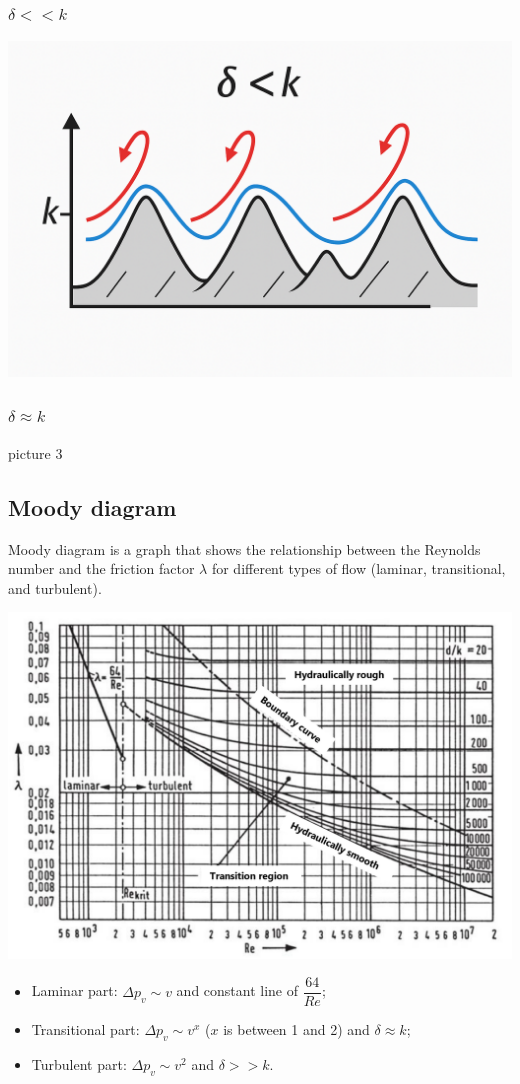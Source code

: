 \documentclass{article}
\begin{document}
\subsubsection{$\delta << k$}
\begin{center}
    \includegraphics[width=.5\textwidth]{media/roughness_turbolent.png}
\end{center}

\subsubsection{$\delta \approx  k$}
picture 3

\newpage
\subsection{Moody diagram}
Moody diagram is a graph that shows the relationship between the Reynolds number
and the friction factor $\lambda$ for different types of flow (laminar, transitional, and turbulent).
\begin{center}
    \includegraphics[width=.8\textwidth]{media/Moody-Diagramm_en.png}
\end{center}

\vspace*{0.5cm}
\begin{itemize}
    \item Laminar part: $\Delta p_v \sim v$ and constant line of $\dfrac{64}{Re}$;
    \item Transitional part: $\Delta p_v \sim v^x$ ($x$ is between 1 and 2) and $\delta \approx k$;
    \item Turbulent part: $\Delta p_v \sim v^2$ and $\delta >> k$.
\end{itemize}
\end{document}
